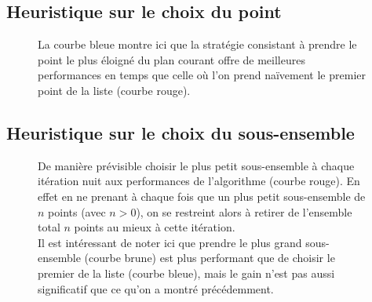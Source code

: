 \documentclass[]{article}
\begin{document}
\subsection*{Heuristique sur le choix du point}\label{heur_choix_du_point}
\begin{figure}[H]
	\caption{La courbe bleue montre ici que la stratégie consistant à prendre le point le plus éloigné du plan courant offre de meilleures performances en temps que celle où l'on prend naïvement le premier point de la liste (courbe rouge).}
\end{figure}

\subsection*{Heuristique sur le choix du sous-ensemble}\label{heur_choix_du_sous_ens}
\begin{figure}[H]
	\caption{
		De manière prévisible choisir le plus petit sous-ensemble à chaque itération nuit aux performances de l'algorithme (courbe rouge). En effet en ne prenant à chaque fois que un plus petit sous-ensemble de $n$ points (avec $n > 0$), on se restreint alors à retirer de l'ensemble total $n$ points au mieux à cette itération.\\
		Il est intéressant de noter ici que prendre le plus grand sous-ensemble (courbe brune) est plus performant que de choisir le premier de la liste (courbe bleue), mais le gain n'est pas aussi significatif que ce qu'on a montré précédemment.
	}
\end{figure}
\end{document}
